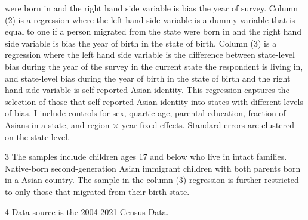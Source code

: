 \begin{table}[H]
{\begin{threeparttable}
\begin{tablenotes}
{                      were born in and the right hand side variable is bias the year of survey.
                      Column (2) is a regression where the left hand side variable is 
                      a dummy variable that is equal to one if a person migrated from the state
                      were born in and the right hand side variable is bias the year of birth in the state of birth.
                      Column (3) is a regression where the left hand side variable is 
                      the difference between state-level bias during the year of the survey in the current state the 
                      respondent is living in, and state-level bias during the year of birth in the state of birth 
                      and the right hand side variable is self-reported Asian identity. This regression captures
                      the selection of those that self-reported Asian identity into states with different levels of bias.
                      I include controls for sex, quartic age, parental education, fraction of Asians in a state, and region × year fixed effects.
                      Standard errors are clustered on the state level.}
\item[3] \footnotesize{The samples include children ages 17 and below who live in intact families. 
                      Native-born second-generation Asian immigrant children with both
                      parents born in a Asian country. The sample in the column (3) regression is further restricted to only those that migrated from their birth state.}
\item[4] \footnotesize{Data source is the 2004-2021 Census Data.}
\end{tablenotes}
\end{threeparttable}}
\end{table}

